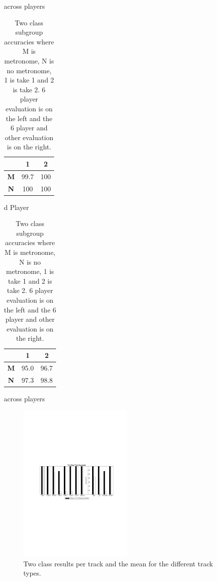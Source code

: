 \documentclass{article}
\begin{document}
{{{\begin{table}[h!]

    \begin{minipage}{.5\linewidth}
      \centering
across players
\begin{tabular}{|c|c|c|}
\cline{2-3}
\multicolumn{1}{l|}{}&\textbf{1} & \textbf{2}  \\ \hline
\textbf{M}            & 99.7     & 100            \\ \cline{1-3} 
\textbf{N}            & 100          & 100            \\ \hline
\end{tabular}d Player
    \end{minipage}%
    \begin{minipage}{.5\linewidth}
      \centering
\begin{tabular}{|c|c|c|}
\cline{2-3}
\multicolumn{1}{l|}{}&\textbf{1} & \textbf{2}  \\ \hline
\textbf{M}            & 95.0   & 96.7            \\ \cline{1-3} 
\textbf{N}            & 97.3          & 98.8            \\ \hline
\end{tabular}across players
    \end{minipage} 
        \caption{Two class subgroup accuracies where M is metronome, N is no metronome, 1 is take 1 and 2 is take 2. 6 player evaluation is on the left and the 6 player and other evaluation is on the right.}
        \label{subgroups}
\end{table}
%
\begin{figure}[h]
\includegraphics[width=0.5\textwidth]{figs/TrackPDF}
\caption{Two class results per track and the mean for the different track types.}
\label{TrackGraph}
\end{figure}

}}}
\end{document}
